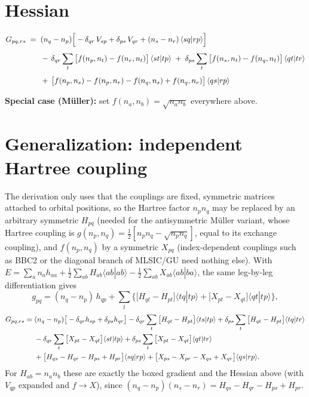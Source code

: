 \documentclass[11pt]{article}
\begin{document}
\section*{Hessian}

\begin{align}
G_{pq,rs} \;=\;\;
& (n_q-n_p)\Big[-\delta_{qr}\,V_{sp} + \delta_{ps}\,V_{qr}
+ (n_s-n_r)\,\langle sq|rp\rangle\Big] \notag\\[4pt]
& -\,\delta_{qr}\sum_t \big[f(n_p,n_t)-f(n_r,n_t)\big]\,\langle st|tp\rangle
\;+\; \delta_{ps}\sum_t \big[f(n_s,n_t)-f(n_q,n_t)\big]\,\langle qt|tr\rangle \notag\\[4pt]
& +\,\big[f(n_p,n_s)-f(n_p,n_r)-f(n_q,n_s)+f(n_q,n_r)\big]\,\langle qs|rp\rangle
\end{align}

\bigskip
\noindent\textbf{Special case (M\"uller):} set $f(n_a,n_b)=\sqrt{n_an_b}$
everywhere above.

\section*{Generalization: independent Hartree coupling}

The derivation only uses that the couplings are fixed, symmetric matrices
attached to orbital positions, so the Hartree factor $n_pn_q$ may be replaced
by an arbitrary symmetric $H_{pq}$ (needed for the antisymmetric M\"uller
variant, whose Hartree coupling is $g(n_p,n_q)=\tfrac12[n_pn_q-\sqrt{n_pn_q}]$,
equal to its exchange coupling), and $f(n_p,n_q)$ by a symmetric $X_{pq}$
(index-dependent couplings such as BBC2 or the diagonal branch of MLSIC/GU need
nothing else). With $E=\sum_a n_ah_{aa}+\tfrac12\sum_{ab}H_{ab}\langle ab|ab\rangle
-\tfrac12\sum_{ab}X_{ab}\langle ab|ba\rangle$, the same leg-by-leg
differentiation gives
\begin{equation}
g_{pq} = (n_q-n_p)\,h_{qp}
+ \sum_t\Big\{\big[H_{qt}-H_{pt}\big]\langle tq|tp\rangle
+ \big[X_{pt}-X_{qt}\big]\langle qt|tp\rangle\Big\},
\end{equation}
\begin{align}
G_{pq,rs} =\;& (n_q-n_p)\big[-\delta_{qr}h_{sp}+\delta_{ps}h_{qr}\big]
- \delta_{qr}\sum_t \big[H_{qt}-H_{pt}\big]\langle ts|tp\rangle
+ \delta_{ps}\sum_t\big[H_{qt}-H_{pt}\big]\langle tq|tr\rangle \notag\\
& -\delta_{qr}\sum_t\big[X_{pt}-X_{qt}\big]\langle st|tp\rangle
+ \delta_{ps}\sum_t\big[X_{pt}-X_{qt}\big]\langle qt|tr\rangle \notag\\
& +\big[H_{qs}-H_{qr}-H_{ps}+H_{pr}\big]\langle sq|rp\rangle
+\big[X_{ps}-X_{pr}-X_{qs}+X_{qr}\big]\langle qs|rp\rangle .
\end{align}
For $H_{ab}=n_an_b$ these are exactly the boxed gradient and the Hessian above
(with $V_{qp}$ expanded and $f\to X$), since $(n_q-n_p)(n_s-n_r)=H_{qs}-H_{qr}-H_{ps}+H_{pr}$.
\end{document}
